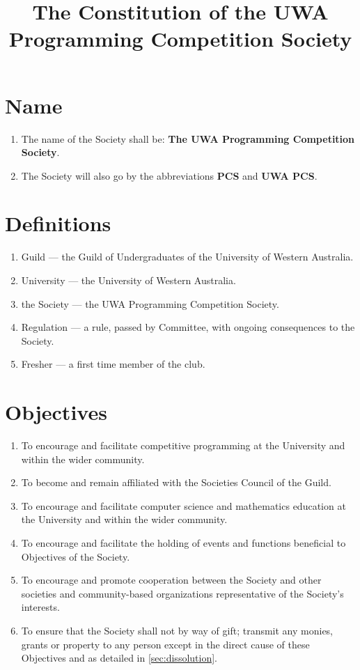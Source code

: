 \documentclass[a4paper]{article}
\begin{document}
\title{The Constitution of the UWA Programming Competition Society}
\date{}

\maketitle


\section{Name}
\begin{enumerate}
	\item The name of the Society shall be: \textbf{The UWA Programming Competition Society}.
    \item The Society will also go by the abbreviations \textbf{PCS} and \textbf{UWA PCS}.
\end{enumerate}


\section{Definitions}
\begin{enumerate}
    \item Guild --- the Guild of Undergraduates of the University of Western Australia.
    \item University --- the University of Western Australia.
    \item the Society --- the UWA Programming Competition Society.
    \item Regulation --- a rule, passed by Committee, with ongoing consequences to the Society.
    \item Fresher --- a first time member of the club.
\end{enumerate}


\section{Objectives} \label{sec:objectives}
\begin{enumerate}
    \item To encourage and facilitate competitive programming at the University and within the wider community.
    \item To become and remain affiliated with the Societies Council of the Guild.
    \item To encourage and facilitate computer science and mathematics education at the University and within the wider community.
    \item To encourage and facilitate the holding of events and functions beneficial to Objectives of the Society.
    \item To encourage and promote cooperation between the Society and other societies and community-based organizations representative of the Society's interests.
    \item To ensure that the Society shall not by way of gift; transmit any monies, grants or property to any person except in the direct cause of these Objectives and as detailed in \cref{sec:dissolution}.
\end{enumerate}
\end{document}
